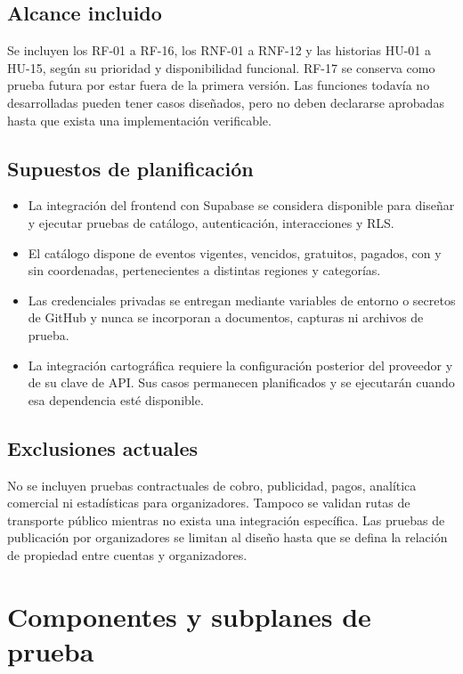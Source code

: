 \documentclass[11pt,a4paper]{article}
\begin{document}
\subsection{Alcance incluido}

Se incluyen los RF-01 a RF-16, los RNF-01 a RNF-12 y las historias HU-01 a HU-15,
según su prioridad y disponibilidad funcional. RF-17 se conserva como prueba futura por
estar fuera de la primera versión. Las funciones todavía no desarrolladas pueden tener
casos diseñados, pero no deben declararse aprobadas hasta que exista una implementación
verificable.

\subsection{Supuestos de planificación}

\begin{itemize}[leftmargin=1.5em]
  \item La integración del frontend con Supabase se considera disponible para diseñar y
        ejecutar pruebas de catálogo, autenticación, interacciones y RLS.
  \item El catálogo dispone de eventos vigentes, vencidos, gratuitos, pagados, con y sin
        coordenadas, pertenecientes a distintas regiones y categorías.
  \item Las credenciales privadas se entregan mediante variables de entorno o secretos de
        GitHub y nunca se incorporan a documentos, capturas ni archivos de prueba.
  \item La integración cartográfica requiere la configuración posterior del proveedor y
        de su clave de API. Sus casos permanecen planificados y se ejecutarán cuando esa
        dependencia esté disponible.
\end{itemize}

\subsection{Exclusiones actuales}

No se incluyen pruebas contractuales de cobro, publicidad, pagos, analítica comercial ni
estadísticas para organizadores. Tampoco se validan rutas de transporte público mientras
no exista una integración específica. Las pruebas de publicación por organizadores se
limitan al diseño hasta que se defina la relación de propiedad entre cuentas y
organizadores.

\section{Componentes y subplanes de prueba}
\end{document}
